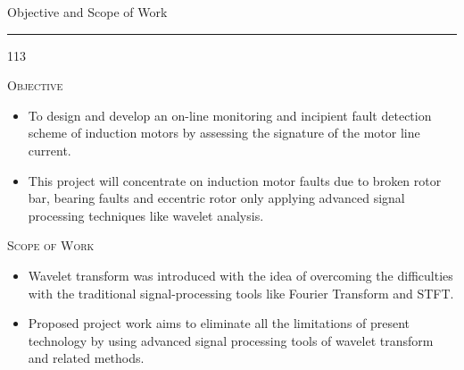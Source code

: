 \documentclass[10pt]{beamer}
\begin{document}
\begin{slide*}
{\large \textsf{Objective and Scope of Work}}\\
\hrule
\vspace{10pt}
\begin{dinglist} {113}
\item \textsc{Objective}
    \begin{itemize}
    \item To design and develop an on-line monitoring and incipient fault detection scheme of induction motors by assessing the signature of the motor line current.
    \item This  project  will concentrate on induction motor faults due to broken rotor bar, bearing faults and eccentric rotor only applying  advanced  signal processing techniques like wavelet analysis.
    \end{itemize}
\item \textsc{Scope of Work}
    \begin{itemize}
    \item Wavelet transform was introduced with the idea of overcoming the difficulties with the traditional signal-processing tools like Fourier Transform and STFT.
    \item Proposed project work aims to eliminate all the limitations of present technology by using advanced signal processing tools of wavelet transform and related methods.
    \end{itemize}
\end{dinglist}
\end{slide*}
\end{document}
